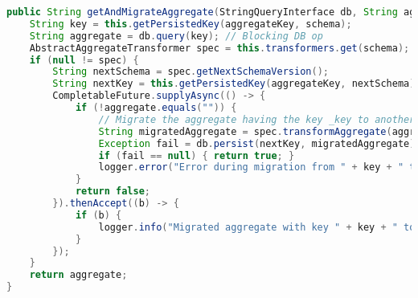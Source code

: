 \begin{lstlisting}[language=Java, caption={Metode for håndtering av GET-spørring i Migrator.}]
public String getAndMigrateAggregate(StringQueryInterface db, String aggregateKey, String schema) {
    String key = this.getPersistedKey(aggregateKey, schema);
    String aggregate = db.query(key); // Blocking DB op
    AbstractAggregateTransformer spec = this.transformers.get(schema);
    if (null != spec) {
        String nextSchema = spec.getNextSchemaVersion();
        String nextKey = this.getPersistedKey(aggregateKey, nextSchema);
        CompletableFuture.supplyAsync(() -> {
            if (!aggregate.equals("")) {
                // Migrate the aggregate having the key _key to another with the key _nextKey using spec
                String migratedAggregate = spec.transformAggregate(aggregate);
                Exception fail = db.persist(nextKey, migratedAggregate);
                if (fail == null) { return true; }
                logger.error("Error during migration from " + key + " to " + nextKey + ":\n"+ fail.toString());
            }
            return false;
        }).thenAccept((b) -> {
            if (b) {
                logger.info("Migrated aggregate with key " + key + " to " + nextKey);
            }
        });
    }
    return aggregate;
}
\end{lstlisting}
